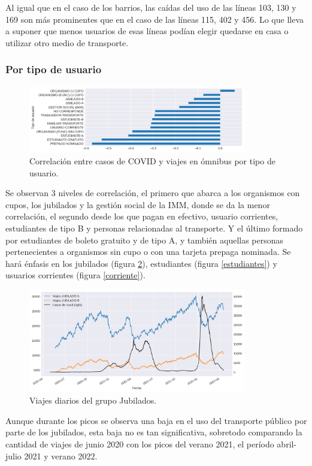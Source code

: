 \documentclass[conference]{IEEEtran}
\begin{document}
Al igual que en el caso de los barrios, las caídas del uso de las líneas 103, 130 y 169 son más prominentes que en el caso de las líneas 115, 402 y 456. Lo que lleva a suponer que menos usuarios de esas líneas podían elegir quedarse en casa o utilizar otro medio de transporte.

\subsubsection{Por tipo de usuario}

\begin{figure}[htbp]
\centerline{\includegraphics[width=95mm]{Pictures/cgc.png}}
\caption{Correlación entre casos de COVID y viajes en ómnibus por tipo de usuario.}
\label{cgc}
\end{figure}

Se observan 3 niveles de correlación, el primero que abarca a los organismos con cupos, los jubilados y la gestión social de la IMM, donde se da la menor correlación, el segundo desde los que pagan en efectivo, usuario corrientes, estudiantes de tipo B y personas relacionadas al transporte. Y el último formado por estudiantes de boleto gratuito y de tipo A, y también aquellas personas pertenecientes a organismos sin cupo o con una tarjeta prepaga nominada. Se hará énfasis en los jubilados (figura \ref{jubilados}), estudiantes (figura \ref{estudiantes}) y usuarios corrientes (figura \ref{corriente}).

\begin{figure}[htbp]
\centerline{\includegraphics[width=95mm]{Pictures/jubilados.png}}
\caption{Viajes diarios del grupo Jubilados.}
\label{jubilados}
\end{figure}

Aunque durante los picos se observa una baja en el uso del transporte público por parte de los jubilados, esta baja no es tan significativa, sobretodo comparando la cantidad de viajes de junio 2020 con los picos del verano 2021, el período abril-julio 2021 y verano 2022.
\end{document}
